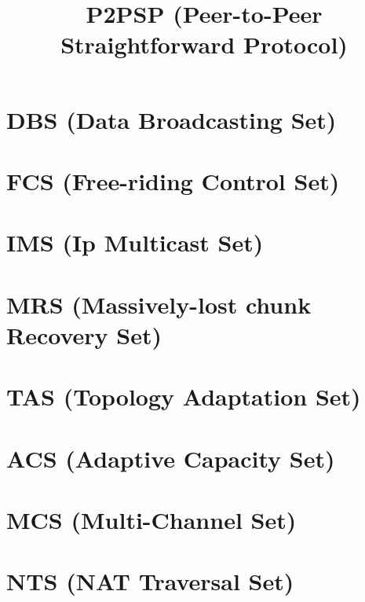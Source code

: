 \newcommand{\note}[1]{\color{red}\textbf{#1}}

\title{P2PSP (Peer-to-Peer Straightforward Protocol)}
\maketitle
\tableofcontents

\begin{abstract}

\end{abstract}

%

\section{DBS (Data Broadcasting Set)}
\label{sec:DBS}


\section{FCS (Free-riding Control Set)}
\label{sec:FCS}


\section{IMS (Ip Multicast Set)}
\label{sec:IMS}


\section{MRS (Massively-lost chunk Recovery Set)}
\label{sec:MRS}


\section{TAS (Topology Adaptation Set)}
\label{sec:TAS}


\section{ACS (Adaptive Capacity Set)}
\label{sec:ACS}


\section{MCS (Multi-Channel Set)}
\label{sec:MCS}


\section{NTS (NAT Traversal Set)}
\label{sec:NTS}



